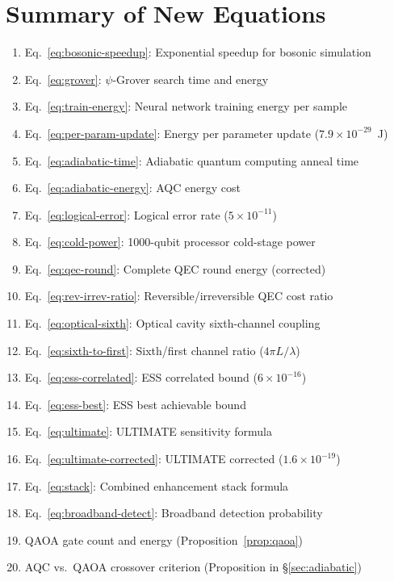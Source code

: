 \documentclass[11pt]{article}
\theoremstyle{definition}
\theoremstyle{remark}
\begin{document}
\section*{Summary of New Equations}

\begin{enumerate}[nosep]
\item Eq.~\eqref{eq:bosonic-speedup}: Exponential speedup for bosonic simulation
\item Eq.~\eqref{eq:grover}: $\psi$-Grover search time and energy
\item Eq.~\eqref{eq:train-energy}: Neural network training energy per sample
\item Eq.~\eqref{eq:per-param-update}: Energy per parameter update ($7.9\times10^{-29}$~J)
\item Eq.~\eqref{eq:adiabatic-time}: Adiabatic quantum computing anneal time
\item Eq.~\eqref{eq:adiabatic-energy}: AQC energy cost
\item Eq.~\eqref{eq:logical-error}: Logical error rate ($5\times10^{-11}$)
\item Eq.~\eqref{eq:cold-power}: 1000-qubit processor cold-stage power
\item Eq.~\eqref{eq:qec-round}: Complete QEC round energy (corrected)
\item Eq.~\eqref{eq:rev-irrev-ratio}: Reversible/irreversible QEC cost ratio
\item Eq.~\eqref{eq:optical-sixth}: Optical cavity sixth-channel coupling
\item Eq.~\eqref{eq:sixth-to-first}: Sixth/first channel ratio ($4\pi L/\lambda$)
\item Eq.~\eqref{eq:ess-correlated}: ESS correlated bound ($6\times10^{-16}$)
\item Eq.~\eqref{eq:ess-best}: ESS best achievable bound
\item Eq.~\eqref{eq:ultimate}: ULTIMATE sensitivity formula
\item Eq.~\eqref{eq:ultimate-corrected}: ULTIMATE corrected ($1.6\times10^{-19}$)
\item Eq.~\eqref{eq:stack}: Combined enhancement stack formula
\item Eq.~\eqref{eq:broadband-detect}: Broadband detection probability
\item QAOA gate count and energy (Proposition~\ref{prop:qaoa})
\item AQC vs.\ QAOA crossover criterion (Proposition in \S\ref{sec:adiabatic})
\end{enumerate}
\end{document}
